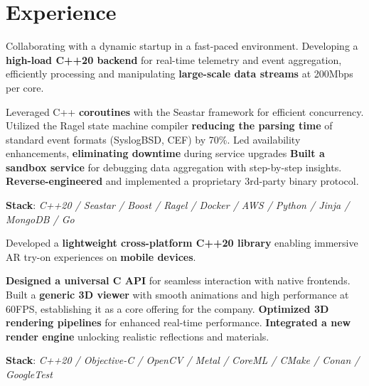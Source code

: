 \documentclass[]{deedy-resume}
\begin{document}
\begin{minipage}[t]{0.70\textwidth}


\section{Experience}


Collaborating with a dynamic startup in a fast-paced environment.
Developing a \textbf{high-load C++20 backend} for real-time telemetry and event aggregation,
efficiently processing and manipulating \textbf{large-scale data streams} at 200Mbps per core.
\begin{descritemize}
    \descritem Leveraged C++ \textbf{coroutines} with the Seastar framework for efficient concurrency.
    \descritem Utilized the Ragel state machine compiler \textbf{reducing the parsing time} of standard event formats (SyslogBSD, CEF) by 70\%.
    \descritem Led availability enhancements, \textbf{eliminating downtime} during service upgrades
    \descritem \textbf{Built a sandbox service} for debugging data aggregation with step-by-step insights.
    \descritem \textbf{Reverse-engineered} and implemented a proprietary 3rd-party binary protocol.
\end{descritemize}
\textbf{Stack}: \textit{C++20 / Seastar / Boost / Ragel / Docker / AWS / Python / Jinja / MongoDB / Go}

\sectionspace



Developed a \textbf{lightweight cross-platform C++20 library} enabling immersive AR try-on experiences on \textbf{mobile devices}.
\begin{descritemize}
    \descritem \textbf{Designed a universal C API} for seamless interaction with native frontends.
    \descritem Built a \textbf{generic 3D viewer} with smooth animations and high performance at 60FPS, establishing it as a core offering for the company.
    \descritem \textbf{Optimized 3D rendering pipelines} for enhanced real-time performance.
    \descritem \textbf{Integrated a new render engine} unlocking realistic reflections and materials.
\end{descritemize}
\textbf{Stack}: \textit{C++20 / Objective-C / OpenCV / Metal / CoreML / CMake / Conan / GoogleTest}


\end{minipage}
\end{document}
